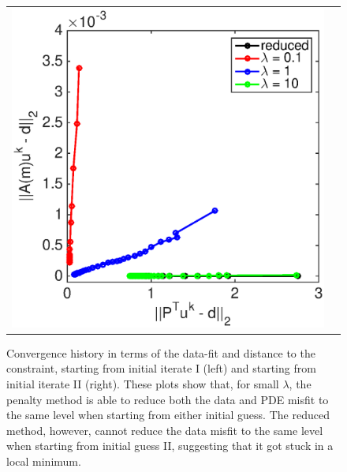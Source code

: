 \documentclass{iopart}
\begin{document}
\begin{figure}
\begin{tabular}{cc}
\includegraphics[scale=.3]{./figs/2D_overthrust2_e}\\
\end{tabular}
\caption{Convergence history in terms of the data-fit and distance to the constraint, starting from initial iterate I (left) and starting from initial iterate II (right). These plots show that, for small $\lambda$, the penalty method is able to reduce both the data and PDE misfit to the same level when starting from either initial guess. The reduced method, however, cannot reduce the data misfit to the same level when starting from initial guess II, suggesting that it got stuck in a local minimum.}
\label{fig:2D_overthrust3}
\end{figure}


\clearpage



\end{document}
